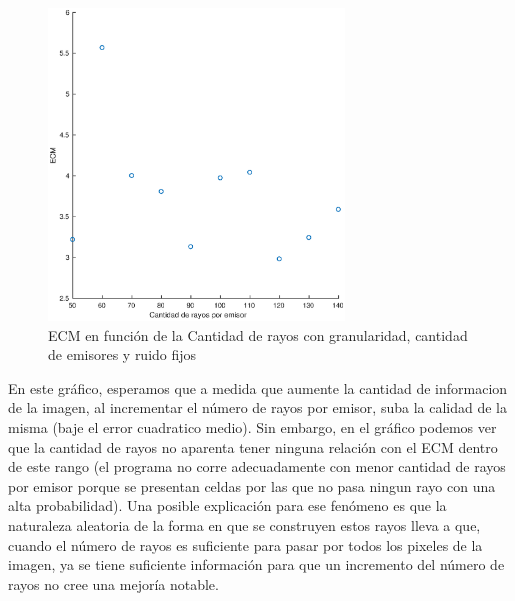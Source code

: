 \begin{figure}[H]
	\centering	\includegraphics[width=0.7\textwidth]{img/cantrayos_ecm}
	\caption{ECM en función de la Cantidad de rayos con granularidad, cantidad de emisores y ruido fijos}
	\label{fig:cantrayos_eps}
\end{figure}

En este gráfico, esperamos que a medida que aumente la cantidad de informacion de la imagen, al incrementar el número de rayos por emisor, suba la calidad de la misma (baje el error cuadratico medio).  Sin embargo, en el gráfico podemos ver que la cantidad de rayos no aparenta tener ninguna relación con el ECM dentro de este rango (el programa no corre adecuadamente con menor cantidad de rayos por emisor porque se presentan celdas por las que no pasa ningun rayo con una alta probabilidad). Una posible explicación para ese fenómeno es  que la naturaleza aleatoria de la forma en que se construyen estos rayos lleva a que, cuando el número de rayos es suficiente para pasar por todos los pixeles de la imagen, ya se tiene suficiente información para que un incremento del número de rayos no cree una mejoría notable.


